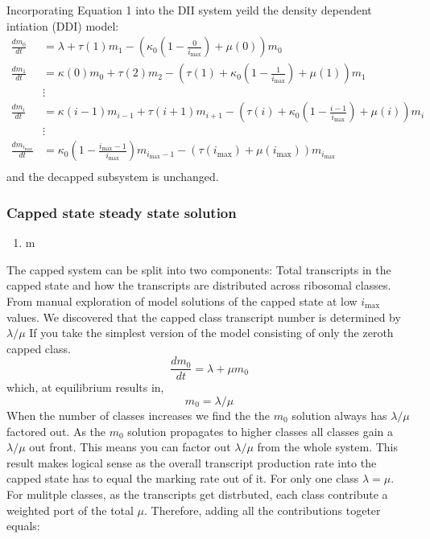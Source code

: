 \documentclass[review]{elsarticle}
\newcommand{\imax}{\ensuremath{{i_{\max}}}\xspace}
\begin{document}
Incorporating Equation 1 into the DII system yeild the density dependent intiation (DDI) model: %
\begin{align*}
\frac{dm_{0}}{dt} &= \lambda+\tau(1)m_{1}-\left(\kappa_0\left(1-\frac{0}{\imax}\right) + \mu(0)\right)m_{0} \\
\frac{dm_{1}}{dt} &= \kappa(0)m_{0}+\tau(2)m_{2}-\left(\tau(1)+\kappa_0\left(1-\frac{1}{\imax}\right)+\mu(1)\right) m_{1}\\
& \vdots & \\
\frac{dm_{i}}{dt} &= \kappa(i-1)m_{i-1}+\tau(i+1)m_{i+1}-\left(\tau(i)+\kappa_0\left(1-\frac{i-1}{\imax}\right)+\mu(i)\right) m_{i} \\
& \vdots & \\
\frac{dm_{\imax}}{dt} &= \kappa_0\left(1-\frac{\imax-1}{\imax}\right)m_{\imax-1}-\left(\tau(\imax)+\mu(\imax)\right) m_{\imax}\\
\end{align*}
and the decapped subsystem is unchanged.

\subsubsection{Capped state steady state solution}
\begin{enumerate}
	\item m


\end{enumerate}






The capped system can be split into two components: Total transcripts in the capped state and how the transcripts are distributed across ribosomal classes. 
From manual exploration of model solutions of the capped state at low \imax values. 
We discovered that the capped class transcript number is determined by $\lambda/ \mu$
If you take the simplest version of the model consisting of only the zeroth capped class.
	\begin{equation} 
		\frac{dm_{0}}{dt} = \lambda + \mu m_{0}
	\end{equation}
which, at equilibrium results in,
	\begin{equation}
		m_{0} = \lambda/\mu
	\end{equation}
When the number of classes increases we find the the $m_{0}$ solution always has $\lambda/ \mu$ factored out. As the $m_{0}$ solution propagates to higher classes all classes gain a $\lambda/ \mu$ out front.
This means you can factor out $\lambda/ \mu$ from the whole system. 
This result makes logical sense as the overall transcript production rate into the capped state has to equal the marking rate out of it. For only one class $\lambda = \mu$. 
For mulitple classes, as the transcripts get distrbuted, each class contribute a weighted port of the total $\mu$. Therefore, adding all the contributions togeter equals:
\end{document}
